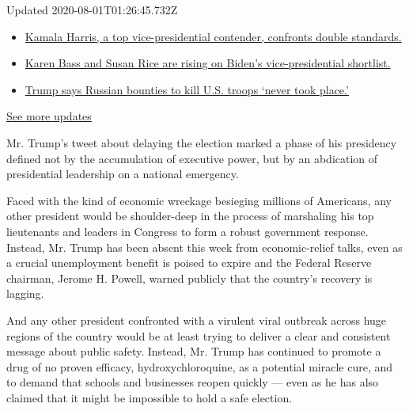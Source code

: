 Updated 2020-08-01T01:26:45.732Z

\begin{itemize}
\tightlist
\item
  \href{https://www.nytimes.com/2020/07/31/us/elections/biden-vs-trump.html?action=click\&pgtype=Article\&state=default\&region=MAIN_CONTENT_1\&context=storylines_live_updates\#link-29fdff45}{Kamala
  Harris, a top vice-presidential contender, confronts double
  standards.}
\item
  \href{https://www.nytimes.com/2020/07/31/us/elections/biden-vs-trump.html?action=click\&pgtype=Article\&state=default\&region=MAIN_CONTENT_1\&context=storylines_live_updates\#link-13ec3d9c}{Karen
  Bass and Susan Rice are rising on Biden's vice-presidential
  shortlist.}
\item
  \href{https://www.nytimes.com/2020/07/31/us/elections/biden-vs-trump.html?action=click\&pgtype=Article\&state=default\&region=MAIN_CONTENT_1\&context=storylines_live_updates\#link-49e9a016}{Trump
  says Russian bounties to kill U.S. troops `never took place.'}
\end{itemize}

\href{https://www.nytimes.com/2020/07/31/us/elections/biden-vs-trump.html?action=click\&pgtype=Article\&state=default\&region=MAIN_CONTENT_1\&context=storylines_live_updates}{See
more updates}

Mr. Trump's tweet about delaying the election marked a phase of his
presidency defined not by the accumulation of executive power, but by an
abdication of presidential leadership on a national emergency.

Faced with the kind of economic wreckage besieging millions of
Americans, any other president would be shoulder-deep in the process of
marshaling his top lieutenants and leaders in Congress to form a robust
government response. Instead, Mr. Trump has been absent this week from
economic-relief talks, even as a crucial unemployment benefit is poised
to expire and the Federal Reserve chairman, Jerome H. Powell, warned
publicly that the country's recovery is lagging.

And any other president confronted with a virulent viral outbreak across
huge regions of the country would be at least trying to deliver a clear
and consistent message about public safety. Instead, Mr. Trump has
continued to promote a drug of no proven efficacy, hydroxychloroquine,
as a potential miracle cure, and to demand that schools and businesses
reopen quickly --- even as he has also claimed that it might be
impossible to hold a safe election.

